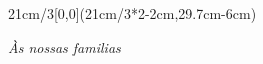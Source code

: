 \begin{textblock*}{21cm/3}[0,0](21cm/3*2-2cm,29.7cm-6cm)
  \begin{flushright}
    {\emph{
      \`As nossas familias}
    }
  \end{flushright}
\end{textblock*}

\null\newpage

